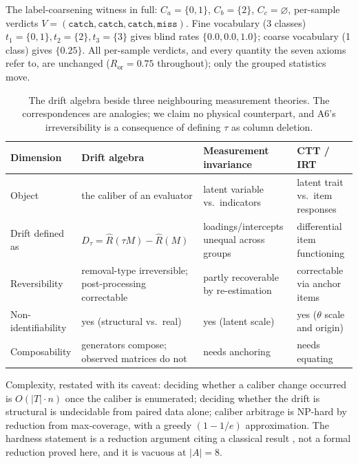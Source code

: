\documentclass{article}
\newcommand{\Rhat}{\hat R}
\newcommand{\catch}{\texttt{catch}}
\newcommand{\miss}{\texttt{miss}}
\begin{document}
The label-coarsening witness in full: $C_a=\{0,1\}$, $C_b=\{2\}$, $C_c=\varnothing$, per-sample verdicts
$V=(\catch,\catch,\catch,\miss)$. Fine vocabulary (3 classes) $t_1=\{0,1\},t_2=\{2\},t_3=\{3\}$ gives blind
rates $\{0.0,0.0,1.0\}$; coarse vocabulary (1 class) gives $\{0.25\}$. All per-sample verdicts, and every
quantity the seven axioms refer to, are unchanged ($R_{\text{or}}=0.75$ throughout); only the grouped
statistics move.

\begin{table}[h]
\centering
\small
\caption{The drift algebra beside three neighbouring measurement theories. The correspondences are
analogies; we claim no physical counterpart, and A6's irreversibility is a consequence of defining $\tau$ as
column deletion.}
\label{tab:metacompare}
\begin{tabular}{@{}p{2.4cm} p{3.0cm} p{3.0cm} p{3.2cm}@{}}
\toprule
Dimension & Drift algebra & Measurement invariance & CTT / IRT \\
\midrule
Object & the caliber of an evaluator & latent variable vs.\ indicators & latent trait vs.\ item responses \\
Drift defined as & $D_\tau=\Rhat(\tau M)-\Rhat(M)$ & loadings/intercepts unequal across groups & differential item functioning \\
Reversibility & removal-type irreversible; post-processing correctable & partly recoverable by re-estimation & correctable via anchor items \\
Non-identifiability & yes (structural vs.\ real) & yes (latent scale) & yes ($\theta$ scale and origin) \\
Composability & generators compose; observed matrices do not & needs anchoring & needs equating \\
\bottomrule
\end{tabular}
\end{table}

Complexity, restated with its caveat: deciding whether a caliber change occurred is $O(|T|\cdot n)$ once the
caliber is enumerated; deciding whether the drift is structural is undecidable from paired data alone;
caliber arbitrage is NP-hard by reduction from max-coverage, with a greedy $(1-1/e)$ approximation. The
hardness statement is a reduction argument citing a classical result \citep{feige1998threshold}, not a formal
reduction proved here, and it is vacuous at $|A|=8$.

\end{document}
